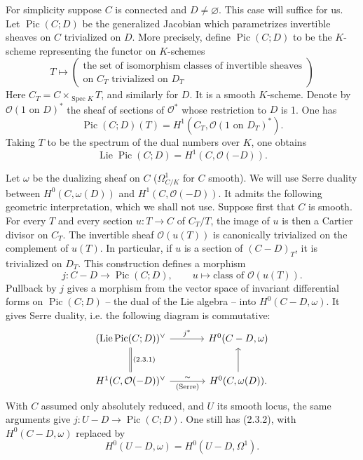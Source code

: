 \documentclass[11pt,leqno]{article}
\DeclareMathOperator{\Spec}{Spec}
\DeclareMathOperator{\Lie}{Lie}
\DeclareMathOperator{\Pic}{Pic}
\newcommand{\OO}{\mathcal O}
\begin{document}
For simplicity suppose $C$ is connected and $D\ne\varnothing$. This case will suffice for us. Let $\Pic(C;D)$ be the generalized Jacobian which parametrizes invertible sheaves on $C$ trivialized on $D$. More precisely, define $\Pic(C;D)$ to be the $K$-scheme representing the functor on $K$-schemes
\[
T\longmapsto
\left(\begin{gathered}
\text{the set of isomorphism classes of invertible sheaves}\\
\text{on $C_T$ trivialized on $D_T$}
\end{gathered}\right)
\]
Here $C_T=C\times_{\Spec K}T$, and similarly for $D$. It is a smooth $K$-scheme. Denote by $\OO(1\text{ on }D)^*$ the sheaf of sections of $\OO^*$ whose restriction to $D$ is 1. One has
\[
        \Pic(C;D)(T)=H^1(C_T,\OO(1\text{ on }D_T)^*).
\]
Taking $T$ to be the spectrum of the dual numbers over $K$, one obtains
\begin{equation}
        \Lie\Pic(C;D)=H^1(C,\OO(-D)). \tag{2.3.1}
\end{equation}

Let $\omega$ be the dualizing sheaf on $C$ ($\Omega^1_{C/K}$ for $C$ smooth). We will use Serre duality between $H^0(C,\omega(D))$ and $H^1(C,\OO(-D))$. It admits the following geometric interpretation, which we shall not use. Suppose first that $C$ is smooth. For every $T$ and every section $u:T\to C$ of $C_T/T$, the image of $u$ is then a Cartier divisor on $C_T$. The invertible sheaf $\OO(u(T))$ is canonically trivialized on the complement of $u(T)$. In particular, if $u$ is a section of $(C-D)_T$, it is trivialized on $D_T$. This construction defines a morphism
\begin{equation}
        j:C-D\longrightarrow\Pic(C;D),\qquad
        u\longmapsto\text{class of }\OO(u(T)). \tag{2.3.2}
\end{equation}
Pullback by $j$ gives a morphism from the vector space of invariant differential forms on $\Pic(C;D)$ -- the dual of the Lie algebra -- into $H^0(C-D,\omega)$. It gives Serre duality, i.e. the following diagram is commutative:
\[
\begin{tikzcd}[column sep=3.5em,row sep=2.5em]
(\Lie\Pic(C;D))^{\vee} \arrow[r,"j^*"] \arrow[d,equal,"{(2.3.1)}"] & H^0(C-D,\omega) \\
H^1(C,\OO(-D))^{\vee} \arrow[r,"\sim","{\text{(Serre)}}"'] & H^0(C,\omega(D)). \arrow[u]
\end{tikzcd}
\]
\clearpage
With $C$ assumed only absolutely reduced, and $U$ its smooth locus, the same arguments give $j:U-D\longrightarrow\Pic(C;D)$. One still has (2.3.2), with $H^0(C-D,\omega)$ replaced by
\[
        H^0(U-D,\omega)=H^0(U-D,\Omega^1).
\]
\end{document}
